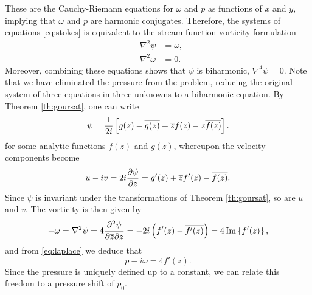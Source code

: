 \documentclass{article}
\begin{document}
These are the Cauchy-Riemann equations for $\omega$ and $p$ as functions of $x$
and $y$, implying that $\omega$ and $p$ are harmonic conjugates. Therefore, the
systems of equations \eqref{eq:stokes} is equivalent to the stream
function-vorticity formulation
\begin{subequations}
\begin{align}
-\nabla^2\psi &= \omega,\\
-\nabla^2\omega &= 0.\label{eq:laplace}
\end{align}
\end{subequations}
Moreover, combining these equations shows that $\psi$ is biharmonic, $\nabla^4
\psi=0$. Note that we have eliminated the pressure from the problem, reducing
the original system of three equations in three unknowns to a biharmonic
equation. By Theorem \ref{th:goursat}, one can write
\begin{equation}
\psi = \frac{1}{2i} \left[g(z) - {\overline{g(z)}} + {\overline{z}}f(z) - z{\overline{f(z)}}\right].
\end{equation}
for some analytic functions $f(z)$ and $g(z)$, whereupon the velocity components become
\begin{equation}
u-iv = 2i\frac{\partial \psi}{\partial z} = g'(z) + {\overline{z}} f'(z) - {\overline{f(z)}}.
\end{equation}
Since $\psi$ is invariant under the transformations of Theorem
\ref{th:goursat}, so are $u$ and $v$. The vorticity is then given by
\begin{equation}
-\omega = \nabla^2 \psi = 4\frac{\partial^2\psi}{\partial {\overline{z}}\partial z} 
   = -2i \left( f'(z) - {\overline{f'(z)}}\right) = 4\Im\left\{f'(z)\right\},
\end{equation}
and from \eqref{eq:laplace} we deduce that
\begin{equation}
p-i\omega = 4 f'(z).
\end{equation}
Since the pressure is uniquely defined up to a constant, we can relate this
freedom to a pressure shift of $p_0$. 
\end{document}
